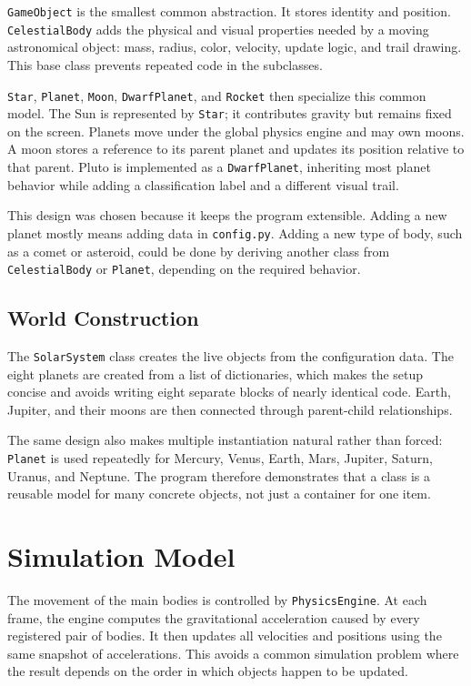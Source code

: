 \documentclass[a4paper,12pt]{article}
\begin{document}
\texttt{GameObject} is the smallest common abstraction. It stores identity and
position. \texttt{CelestialBody} adds the physical and visual properties needed
by a moving astronomical object: mass, radius, color, velocity, update logic,
and trail drawing. This base class prevents repeated code in the subclasses.

\texttt{Star}, \texttt{Planet}, \texttt{Moon}, \texttt{DwarfPlanet}, and
\texttt{Rocket} then specialize this common model. The Sun is represented by
\texttt{Star}; it contributes gravity but remains fixed on the screen. Planets
move under the global physics engine and may own moons. A moon stores a
reference to its parent planet and updates its position relative to that
parent. Pluto is implemented as a \texttt{DwarfPlanet}, inheriting most planet
behavior while adding a classification label and a different visual trail.

This design was chosen because it keeps the program extensible. Adding a new
planet mostly means adding data in \texttt{config.py}. Adding a new type of
body, such as a comet or asteroid, could be done by deriving another class from
\texttt{CelestialBody} or \texttt{Planet}, depending on the required behavior.

\subsection{World Construction}

The \texttt{SolarSystem} class creates the live objects from the configuration
data. The eight planets are created from a list of dictionaries, which makes
the setup concise and avoids writing eight separate blocks of nearly identical
code. Earth, Jupiter, and their moons are then connected through parent-child
relationships.

The same design also makes multiple instantiation natural rather than forced:
\texttt{Planet} is used repeatedly for Mercury, Venus, Earth, Mars, Jupiter,
Saturn, Uranus, and Neptune. The program therefore demonstrates that a class is
a reusable model for many concrete objects, not just a container for one item.

\section{Simulation Model}

The movement of the main bodies is controlled by \texttt{PhysicsEngine}. At
each frame, the engine computes the gravitational acceleration caused by every
registered pair of bodies. It then updates all velocities and positions using
the same snapshot of accelerations. This avoids a common simulation problem
where the result depends on the order in which objects happen to be updated.
\end{document}
